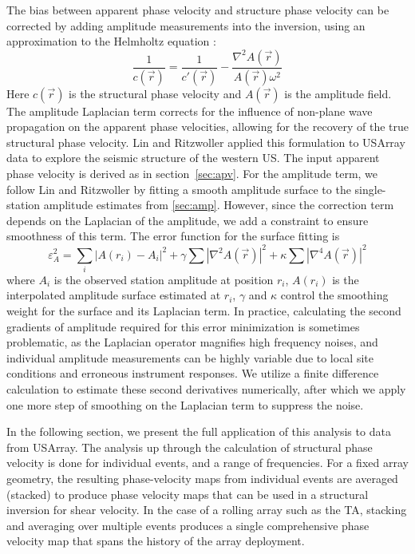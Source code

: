 \documentclass[referee]{gji}
\begin{document}
The bias between apparent phase velocity and structure phase velocity can be corrected by adding amplitude measurements into the inversion, using an approximation to the Helmholtz equation \cite{Wielandt:1993ws,Lin:2011fw}:
\[
\frac{1}{c(\vec{r})} = \frac{1}{c'(\vec{r})} - 
\frac{ \nabla^2 A(\vec{r})}{A(\vec{r}) \omega^2}
\]
Here $c(\vec{r})$ is the structural phase velocity and $A(\vec{r})$ is the amplitude field. The amplitude Laplacian term corrects for the influence of non-plane wave propagation on the apparent phase velocities, allowing for the recovery of the true structural phase velocity. Lin and Ritzwoller  applied this formulation to USArray data to explore the seismic structure of the western US.
The input apparent phase velocity is derived as in section~\ref{sec:apv}.  For the amplitude term, we follow Lin and Ritzwoller  by fitting a smooth amplitude surface to the single-station amplitude estimates from \ref{sec:amp}. However, since the correction term depends on the Laplacian of the amplitude, we add a constraint to ensure smoothness of this term. The error function for the surface fitting is
\[
\varepsilon_{A}^2 = \sum_i\left|A(r_i)-A_i\right|^2 + \gamma\sum |\nabla^2 A(\vec{r})|^2 + \kappa \sum |\nabla^4 A(\vec{r})|^2
\]
where $A_i$ is the observed station amplitude at position $r_i$, $A(r_i)$ is the interpolated amplitude surface estimated at $r_i$, $\gamma$ and $\kappa$ control the smoothing weight for the surface and its Laplacian term. In practice, calculating the second gradients of amplitude required for this error minimization is sometimes problematic, as the Laplacian operator magnifies high frequency noises, and individual amplitude measurements can be highly variable due to local site conditions and erroneous instrument responses. We utilize a finite difference calculation to estimate these second derivatives numerically, after which we apply one more step of smoothing on the Laplacian term to suppress the noise.

In the following section, we present the full application of this analysis to data from USArray. The analysis up through the calculation of structural phase velocity is done for individual events, and a range of frequencies.  For a fixed array geometry, the resulting phase-velocity maps from individual events are averaged (stacked) to produce phase velocity maps that can be used in a structural inversion for shear velocity.  In the case of a rolling array such as the TA, stacking and averaging over multiple events produces a single comprehensive phase velocity map that spans the history of the array deployment.   
\end{document}

